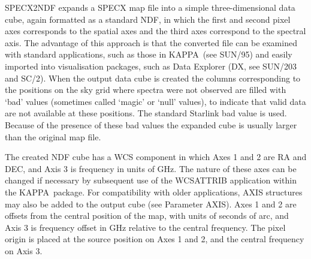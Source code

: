 \documentclass[twoside,11pt]{article}
\newcommand{\xref}[3]{#1}
\newcommand{\KAPPA}{{\footnotesize KAPPA}}
\begin{document}
{{      SPECX2NDF expands a SPECX map file into a simple three-dimensional
      data cube, again formatted as a standard NDF, in which the first
      and second pixel axes corresponds to the spatial axes and the third
      axes correspond to the spectral axis.  The advantage of
      this approach is that the converted file can be examined with
      standard applications, such as those in \KAPPA\ (see \xref{SUN/95}{sun95}{}) and
      easily imported into visualisation packages, such as Data Explorer
      (DX, see \xref{SUN/203}{sun203}{} and \xref{SC/2}{sc2}{}).  When the 
      output data cube is created
      the columns corresponding to the positions on the sky grid where
      spectra were not observed are filled with \xref{`bad'
      values}{sun95}{se_masking} (sometimes
      called `magic' or `null' values), to indicate that valid data are
      not available at these positions.  The \xref{standard Starlink
      bad value}{sun95}{se_badmasking}
      is used.  Because of the presence of these bad values the expanded
      cube is usually larger than the original map file.

      The created NDF cube has a WCS component in which Axes 1 and 2 are
      RA and DEC, and Axis 3 is frequency in units of GHz. The nature of
      these axes can be changed if necessary by subsequent use of the
      \xref{WCSATTRIB}{sun95}{WCSATTRIB} application within the \KAPPA\ package.
      For compatibility with older applications, AXIS structures may also 
      be added to the output cube (see Parameter AXIS).  Axes 1 and 2 are 
      offsets from the central position of the map,
      with units of seconds of arc, and Axis 3 is frequency offset in GHz
      relative to the central frequency.  The pixel origin is placed at the
      source position on Axes 1 and 2, and the central frequency on Axis 3.

}}
\end{document}
